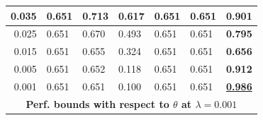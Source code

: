 \documentclass[letterpaper, 10 pt, conference]{ieeeconf}
\begin{document}
\begin{figure}[!t]
\begin{minipage}{\columnwidth}
{\begin{tabular}{|lllllll|}
\multicolumn{1}{|r|}{0.035} & \multicolumn{1}{l|}{0.651} & \multicolumn{1}{l|}{0.713} & \multicolumn{1}{l|}{0.617} & \multicolumn{1}{l|}{0.651} & \multicolumn{1}{l|}{0.651} & \textbf{0.901} \\ \hline
\multicolumn{1}{|r|}{0.025} & \multicolumn{1}{l|}{0.651} & \multicolumn{1}{l|}{0.670} & \multicolumn{1}{l|}{0.493} & \multicolumn{1}{l|}{0.651} & \multicolumn{1}{l|}{0.651} & \textbf{0.795} \\ \hline
\multicolumn{1}{|r|}{0.015} & \multicolumn{1}{l|}{0.651} & \multicolumn{1}{l|}{0.655} & \multicolumn{1}{l|}{0.324} & \multicolumn{1}{l|}{0.651} & \multicolumn{1}{l|}{0.651} & \textbf{0.656} \\ \hline
\multicolumn{1}{|r|}{0.005} & \multicolumn{1}{l|}{0.651} & \multicolumn{1}{l|}{0.652} & \multicolumn{1}{l|}{0.118} & \multicolumn{1}{l|}{0.651} & \multicolumn{1}{l|}{0.651} & \textbf{0.912} \\ \hline
\multicolumn{1}{|r|}{0.001} & \multicolumn{1}{l|}{0.651} & \multicolumn{1}{l|}{0.651} & \multicolumn{1}{l|}{0.100} & \multicolumn{1}{l|}{0.651} & \multicolumn{1}{l|}{0.651} & {\ul \textbf{0.986}} \\ \hline\hline
\multicolumn{7}{|c|}{\textbf{Perf. bounds with respect to $\theta$ at $\lambda=0.001$}} \\ \hline

\end{tabular}}
\end{minipage}
\end{figure}
\end{document}
